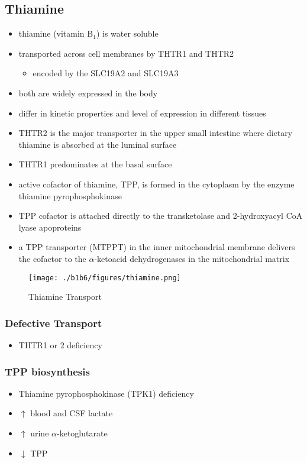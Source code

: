 \documentclass{scrartcl}
\begin{document}
\subsection{Thiamine}
\label{sec:org8071b10}
\begin{itemize}
\item thiamine (vitamin B\(_{\text{1}}\)) is water soluble
\item transported across cell membranes by THTR1 and THTR2
\begin{itemize}
\item encoded by the SLC19A2 and SLC19A3
\end{itemize}
\item both are widely expressed in the body
\item differ in kinetic properties and level of expression in different tissues
\item THTR2 is the major transporter in the upper small intestine where
dietary thiamine is absorbed at the luminal surface
\item THTR1 predominates at the basal surface
\item active cofactor of thiamine, TPP, is formed in the cytoplasm by the
enzyme thiamine pyrophosphokinase
\item TPP cofactor is attached directly to the transketolase and 2-hydroxyacyl CoA lyase apoproteins
\item a TPP transporter (MTPPT) in the inner mitochondrial membrane
delivers the cofactor to the \(\alpha\)-ketoacid dehydrogenases in the
mitochondrial matrix
\end{itemize}

\begin{figure}[htbp]
\centering
\texttt{[image: ./b1b6/figures/thiamine.png]}
\caption{\label{fig:orgf4987ea}
Thiamine Transport}
\end{figure}

\subsubsection{Defective Transport}
\label{sec:org7713c0b}
\begin{itemize}
\item THTR1 or 2 deficiency
\end{itemize}
\subsubsection{TPP biosynthesis}
\label{sec:orgcc17328}
\begin{itemize}
\item Thiamine pyrophosphokinase (TPK1) deficiency
\item \(\uparrow\) blood and CSF lactate
\item \(\uparrow\) urine \(\alpha\)-ketoglutarate
\item \(\downarrow\) TPP
\end{itemize}
\end{document}
